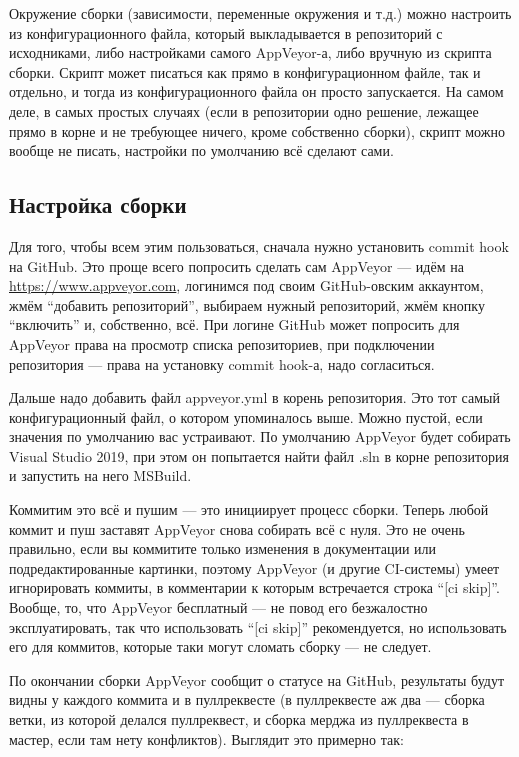 \documentclass[a5paper]{article}
\begin{document}
Окружение сборки (зависимости, переменные окружения и т.д.) можно настроить из конфигурационного файла, который выкладывается в репозиторий с исходниками, либо настройками самого AppVeyor-а, либо вручную из скрипта сборки. Скрипт может писаться как прямо в конфигурационном файле, так и отдельно, и тогда из конфигурационного файла он просто запускается. На самом деле, в самых простых случаях (если в репозитории одно решение, лежащее прямо в корне и не требующее ничего, кроме собственно сборки), скрипт можно вообще не писать, настройки по умолчанию всё сделают сами.

\subsection{Настройка сборки}

Для того, чтобы всем этим пользоваться, сначала нужно установить commit hook на GitHub. Это проще всего попросить сделать сам AppVeyor --- идём на \url{https://www.appveyor.com}, логинимся под своим GitHub-овским аккаунтом, жмём ``добавить репозиторий'', выбираем нужный репозиторий, жмём кнопку ``включить'' и, собственно, всё. При логине GitHub может попросить для AppVeyor права на просмотр списка репозиториев, при подключении репозитория --- права на установку commit hook-а, надо согласиться.

Дальше надо добавить файл appveyor.yml в корень репозитория. Это тот самый конфигурационный файл, о котором упоминалось выше. Можно пустой, если значения по умолчанию вас устраивают. По умолчанию AppVeyor будет собирать Visual Studio 2019, при этом он попытается найти файл .sln в корне репозитория и запустить на него MSBuild.

Коммитим это всё и пушим --- это инициирует процесс сборки. Теперь любой коммит и пуш заставят AppVeyor снова собирать всё с нуля. Это не очень правильно, если вы коммитите только изменения в документации или подредактированные картинки, поэтому AppVeyor (и другие CI-системы) умеет игнорировать коммиты, в комментарии к которым встречается строка ``[ci skip]''. Вообще, то, что AppVeyor бесплатный --- не повод его безжалостно эксплуатировать, так что использовать ``[ci skip]'' рекомендуется, но использовать его для коммитов, которые таки могут сломать сборку --- не следует.

По окончании сборки AppVeyor сообщит о статусе на GitHub, результаты будут видны у каждого коммита и в пуллреквесте (в пуллреквесте аж два --- сборка ветки, из которой делался пуллреквест, и сборка мерджа из пуллреквеста в мастер, если там нету конфликтов). Выглядит это примерно так:
\end{document}
